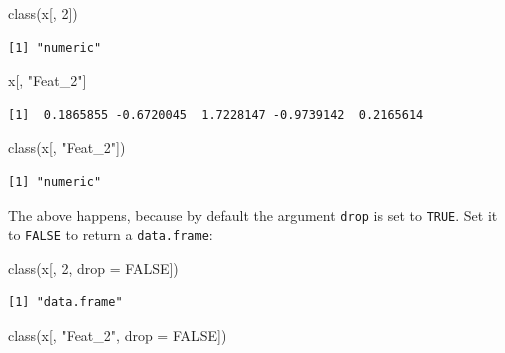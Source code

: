 \documentclass[
]{book}
\newenvironment{Shaded}{\begin{snugshade}}{\end{snugshade}}
\newcommand{\AttributeTok}[1]{\textcolor[rgb]{0.77,0.63,0.00}{#1}}
\newcommand{\ConstantTok}[1]{\textcolor[rgb]{0.00,0.00,0.00}{#1}}
\newcommand{\DecValTok}[1]{\textcolor[rgb]{0.00,0.00,0.81}{#1}}
\newcommand{\FunctionTok}[1]{\textcolor[rgb]{0.00,0.00,0.00}{#1}}
\newcommand{\NormalTok}[1]{#1}
\newcommand{\StringTok}[1]{\textcolor[rgb]{0.31,0.60,0.02}{#1}}
\begin{document}
\begin{Shaded}
\begin{Highlighting}[]
\FunctionTok{class}\NormalTok{(x[, }\DecValTok{2}\NormalTok{])}
\end{Highlighting}
\end{Shaded}

\begin{verbatim}
[1] "numeric"
\end{verbatim}

\begin{Shaded}
\begin{Highlighting}[]
\NormalTok{x[, }\StringTok{"Feat\_2"}\NormalTok{]}
\end{Highlighting}
\end{Shaded}

\begin{verbatim}
[1]  0.1865855 -0.6720045  1.7228147 -0.9739142  0.2165614
\end{verbatim}

\begin{Shaded}
\begin{Highlighting}[]
\FunctionTok{class}\NormalTok{(x[, }\StringTok{"Feat\_2"}\NormalTok{])}
\end{Highlighting}
\end{Shaded}

\begin{verbatim}
[1] "numeric"
\end{verbatim}

The above happens, because by default the argument \texttt{drop} is set to \texttt{TRUE}. Set it to \texttt{FALSE} to return a \texttt{data.frame}:

\begin{Shaded}
\begin{Highlighting}[]
\FunctionTok{class}\NormalTok{(x[, }\DecValTok{2}\NormalTok{, }\AttributeTok{drop =} \ConstantTok{FALSE}\NormalTok{])}
\end{Highlighting}
\end{Shaded}

\begin{verbatim}
[1] "data.frame"
\end{verbatim}

\begin{Shaded}
\begin{Highlighting}[]
\FunctionTok{class}\NormalTok{(x[, }\StringTok{"Feat\_2"}\NormalTok{, }\AttributeTok{drop =} \ConstantTok{FALSE}\NormalTok{])}
\end{Highlighting}
\end{Shaded}
\end{document}
